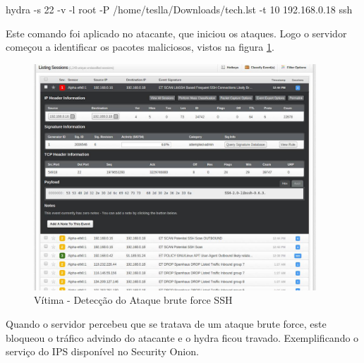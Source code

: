 	\begin{framed}
		hydra -s 22 -v -l root -P /home/teslla/Downloads/tech.lst -t 10 192.168.0.18 ssh
	\end{framed}

	Este comando foi aplicado no atacante, que iniciou os ataques. Logo o servidor
	começou a identificar os pacotes maliciosos, vistos na figura \ref{fig:ssh_vitima}.

	\begin{figure}[h]
		\centering
		\includegraphics[width=400px, scale=1]{resource/ssh_vitima}
		\caption{Vítima - Detecção do Ataque brute force SSH}
		\label{fig:ssh_vitima}
	\end{figure}
	\newpage
 	Quando o servidor percebeu que se tratava de um ataque brute force, este bloqueou
	o tráfico advindo do atacante e o hydra ficou travado. Exemplificando o serviço
	do IPS disponível no Security Onion.
